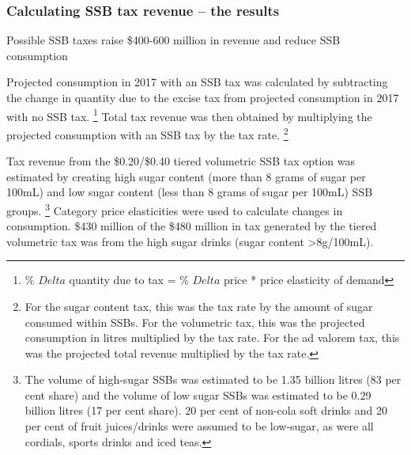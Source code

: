 \documentclass[embargoed]{grattan}
\begin{document}
\subsubsection{Calculating SSB tax revenue -- the results }\label{calculating-ssb-tax-revenue-the-results}

\begin{table}
\caption{Possible SSB taxes raise \$400-600 million in revenue and reduce SSB consumption}



\end{table}

Projected consumption in 2017 with an SSB tax was calculated by subtracting the change in quantity due to the excise tax from projected consumption in 2017 with no SSB tax.%
\footnote{\% $Delta$ quantity due to tax = \% $Delta$ price * price elasticity of demand} Total tax revenue was then obtained by multiplying the projected consumption with an SSB tax by the tax rate.%
\footnote{For the sugar content tax, this was the tax rate by the amount of sugar consumed within SSBs.
For the volumetric tax, this was the projected consumption in litres multiplied by the tax rate.
For the ad valorem tax, this was the projected total revenue multiplied by the tax rate.}

Tax revenue from the \$0.20/\$0.40 tiered volumetric SSB tax option was estimated by creating high sugar content (more than 8 grams of sugar per 100mL) and low sugar content (less than 8 grams of sugar per 100mL) SSB groups.%
\footnote{The volume of high-sugar SSBs was estimated to be 1.35 billion litres (83 per cent share) and the volume of low sugar SSBs was estimated to be 0.29 billion litres (17 per cent share). 20 per cent of non-cola soft drinks and 20 per cent of fruit juices/drinks were assumed to be low-sugar, as were all cordials, sports drinks and iced teas.} Category price elasticities were used to calculate changes in consumption. \$430 million of the \$480 million in tax generated by the tiered volumetric tax was from the high sugar drinks (sugar content \textgreater{}8g/100mL).
\end{document}
